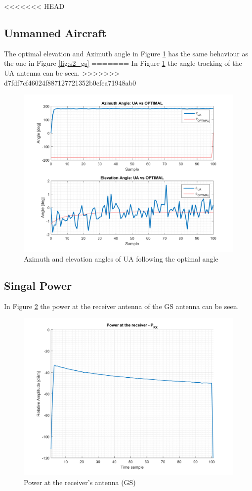<<<<<<< HEAD
\subsection{Unmanned Aircraft}
The optimal elevation and Azimuth angle in Figure \ref{fig:s2_ua} has the same behaviour as the one in Figure \ref{fig:s2_gs} 
=======
In Figure \ref{fig:s2_ua} the angle tracking of the UA antenna can be seen.
>>>>>>> d7fdf7cf46024f887127721352b0cfea71948ab0

\begin{figure}[H]
	\centering
	\includegraphics[scale=0.8]{figures/s2_ua.png}
	\caption{Azimuth and elevation angles of UA following the optimal angle}
	\label{fig:s2_ua}
\end{figure}


\subsection*{Singal Power}
In Figure \ref{fig:s2_power} the power at the receiver antenna of the GS antenna can be seen.

\begin{figure}[H]
	\centering
	\includegraphics[scale=0.8]{figures/s2_power.png}
	\caption{Power at the receiver's antenna (GS)}
	\label{fig:s2_power}
\end{figure}

